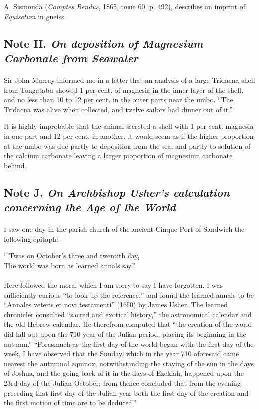\documentclass[a4paper, 12pt, oneside, landscape]{article}
\begin{document}
A. Sismonda (\emph{Comptes Rendus}, 1865, tome 60, p. 492), describes an imprint of \emph{Equisetum} in gneiss.

\subsection{Note H. \emph{On deposition of Magnesium Carbonate from Seawater}}
\paragraph{}
Sir John Murray informed me in a letter that an analysis of a large Tridacna shell from Tongatabu showed 1 per cent. of magnesia in the inner layer of the shell, and no less than 10 to 12 per cent. in the outer parts near the umbo. ``The Tridacna was alive when collected, and twelve sailors had dinner out of it.''

It is highly improbable that the animal secreted a shell with 1 per cent. magnesia in one part and 12 per cent. in another. It would seem as if the higher proportion at the umbo was due partly to deposition from the sea, and partly to solution of the calcium carbonate leaving a larger proportion of magnesium carbonate behind.

\subsection{Note J. \emph{On Archbishop Usher's calculation concerning the Age of the World}}
\paragraph{}
I saw one day in the parish church of the ancient Cinque Port of Sandwich the following epitaph:--
\begin{displayquote}
``'Twas on October's three and twentith day,\\The world was born as learned annals say.''
\end{displayquote}
\paragraph{}
Here followed the moral which I am sorry to say I have forgotten. I was sufficiently curious ``to look up the reference,'' and found the learned annals to be ``Annales veteris et novi testamenti'' (1650) by James Usher. The learned chronicler consulted ``sacred and exotical history,'' the astronomical calendar and the old Hebrew calendar. He therefrom computed that ``the creation of the world did fall out upon the 710 year of the Julian period, placing its beginning in the autumn.'' ``Forasmuch as the first day of the world began with the first day of the week, I have observed that the Sunday, which in the year 710 aforesaid came nearest the autumnal equinox, notwithstanding the staying of the sun in the days of Joshua, and the going back of it in the days of Ezekiah, happened upon the 23rd day of the Julian October; from thence concluded that from the evening preceding that first day of the Julian year both the first day of the creation and the first motion of time are to be deduced.''
\end{document}

